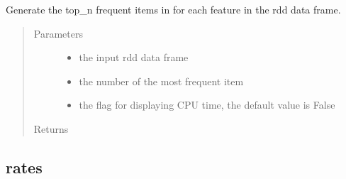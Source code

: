 \documentclass[letterpaper,12pt,english]{sphinxmanual}
\begin{document}
\begin{fulllineitems}
Generate the top\_n frequent items in for each feature in the rdd data frame.
\begin{quote}\begin{description}
\item[{Parameters}] \leavevmode\begin{itemize}
\item {} 
 \textendash{} the input rdd data frame

\item {} 
 \textendash{} the number of the most frequent item

\item {} 
 \textendash{} the flag for displaying CPU time, the default value is False

\end{itemize}

\item[{Returns}] \leavevmode


\end{description}\end{quote}

\end{fulllineitems}



\subsection{rates}
\label{\detokenize{basics:rates}}
\end{document}
